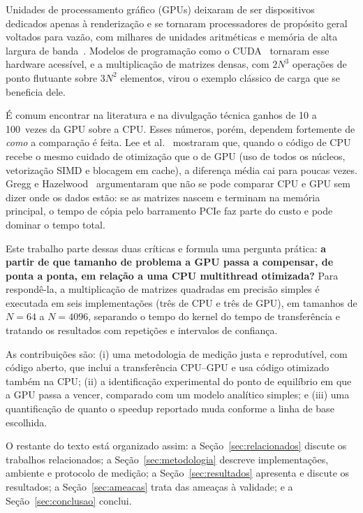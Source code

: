 \documentclass[12pt]{article}
\newcommand{\nMax}{4096}
\newcommand{\nMin}{64}
\begin{document}
Unidades de processamento gráfico (GPUs) deixaram de ser dispositivos
dedicados apenas à renderização e se tornaram processadores de propósito geral
voltados para vazão, com milhares de unidades aritméticas e memória de alta
largura de banda~\cite{owens2008}. Modelos de programação como o
CUDA~\cite{nickolls2008} tornaram esse hardware acessível, e a multiplicação
de matrizes densas, com $2N^3$ operações de ponto flutuante sobre $3N^2$
elementos, virou o exemplo clássico de carga que se beneficia dele.

É comum encontrar na literatura e na divulgação técnica ganhos de 10 a
100~vezes da GPU sobre a CPU. Esses números, porém, dependem fortemente de
\emph{como} a comparação é feita. Lee et al.~\cite{lee2010} mostraram
que, quando o código de CPU recebe o mesmo cuidado de otimização que o de GPU
(uso de todos os núcleos, vetorização SIMD e blocagem em cache), a diferença
média cai para poucas vezes. Gregg e Hazelwood~\cite{gregg2011}
argumentaram que não se pode comparar CPU e GPU sem dizer onde os dados estão:
se as matrizes nascem e terminam na memória principal, o tempo de cópia pelo
barramento PCIe faz parte do custo e pode dominar o tempo total.

Este trabalho parte dessas duas críticas e formula uma pergunta prática:
\textbf{a partir de que tamanho de problema a GPU passa a compensar, de ponta a
ponta, em relação a uma CPU multithread otimizada?} Para respondê-la, a
multiplicação de matrizes quadradas em precisão simples é executada em seis
implementações (três de CPU e três de GPU), em tamanhos de $N=\nMin$ a
$N=\nMax$, separando o tempo do kernel do tempo de transferência e tratando
os resultados com repetições e intervalos de confiança.

As contribuições são: (i) uma metodologia de medição justa e reprodutível,
com código aberto, que inclui a transferência CPU--GPU e usa código
otimizado também na CPU; (ii) a identificação experimental do ponto de
equilíbrio em que a GPU passa a vencer, comparado com um modelo analítico
simples; e (iii) uma quantificação de quanto o speedup reportado muda conforme
a linha de base escolhida.

O restante do texto está organizado assim: a Seção~\ref{sec:relacionados}
discute os trabalhos relacionados; a Seção~\ref{sec:metodologia} descreve
implementações, ambiente e protocolo de medição; a
Seção~\ref{sec:resultados} apresenta e discute os resultados; a
Seção~\ref{sec:ameacas} trata das ameaças à validade; e a
Seção~\ref{sec:conclusao} conclui.
\end{document}
